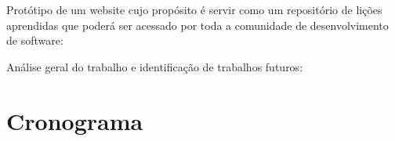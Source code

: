 \documentclass[a4paper,11pt]{article}
\newcounter{contadorDeEtapas}
\begin{document}
\begin{list}{\bfseries{}E -~}{\bfseries}
			\textnormal{}

		\item Protótipo de um website cujo propósito é servir como um repositório de lições aprendidas que poderá ser acessado por toda a comunidade de desenvolvimento de software:

			\textnormal{}

		\item Análise geral do trabalho e identificação de trabalhos futuros:

			\textnormal{}

\end{list}

\section{Cronograma}



\end{document}
